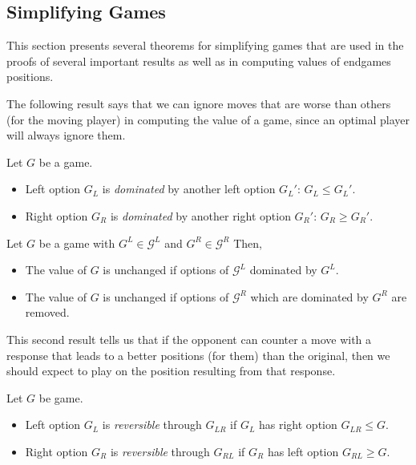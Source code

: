 \documentclass[../math194_paper.tex]{subfiles}
\begin{document}
\subsection{Simplifying Games}

This section presents several theorems for simplifying games that are 
used in the proofs of several important results as well as in computing 
values of endgames positions. 

The following result says that we can ignore moves that are worse than 
others (for the moving player) in computing the value of a game, since 
an optimal player will always ignore them.

\begin{definition} Let $G$ be a game.
    \begin{itemize}
        \item Left option $G_L$ is \textit{dominated} by another left option $G_L'$:
        $G_L \leq G_L'$.
        \item Right option $G_R$ is \textit{dominated} by another right option $G_R'$:
        $G_R \geq G_R'$.
    \end{itemize}
\end{definition}

\begin{theorem}
    \label{dominated}
    Let $G$ be a game with $G^L \in \mathcal{G}^L$ and $G^R \in \mathcal{G}^R$ Then,
    \begin{itemize}
        \item The value of $G$ is unchanged if options of $\mathcal{G}^L$ dominated by $G^L$.
        \item The value of $G$ is unchanged if options of $\mathcal{G}^R$ 
    which are dominated by $G^R$ are removed. 
    \end{itemize}
\end{theorem}

This second result tells us that if the opponent can counter a move with a 
response that leads to a better positions (for them) than the original, then we 
should expect to play on the position resulting from that response.
\begin{definition} 
    Let $G$ be game. 
    \begin{itemize}
        \item Left option $G_L$ is \textit{reversible} through $G_{LR}$ if
        $G_L$ has right option $G_{LR} \leq G$. 
        \item Right option $G_R$ is \textit{reversible} through $G_{RL}$ if 
        $G_R$ has left option $G_{RL} \geq G$.
    \end{itemize}
\end{definition}
\end{document}
